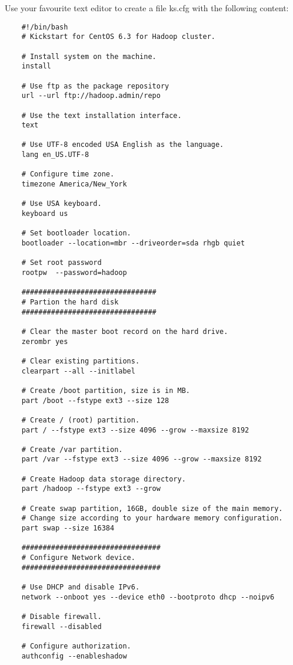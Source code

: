 Use your favourite text editor to create a file ks.cfg with the following content: \\
\begin{verbatim}
    #!/bin/bash
    # Kickstart for CentOS 6.3 for Hadoop cluster.

    # Install system on the machine.
    install

    # Use ftp as the package repository
    url --url ftp://hadoop.admin/repo

    # Use the text installation interface.
    text

    # Use UTF-8 encoded USA English as the language.
    lang en_US.UTF-8

    # Configure time zone.
    timezone America/New_York

    # Use USA keyboard.
    keyboard us

    # Set bootloader location.
    bootloader --location=mbr --driveorder=sda rhgb quiet

    # Set root password
    rootpw  --password=hadoop

    ################################
    # Partion the hard disk
    ################################

    # Clear the master boot record on the hard drive.
    zerombr yes

    # Clear existing partitions.
    clearpart --all --initlabel

    # Create /boot partition, size is in MB.
    part /boot --fstype ext3 --size 128

    # Create / (root) partition.
    part / --fstype ext3 --size 4096 --grow --maxsize 8192

    # Create /var partition.
    part /var --fstype ext3 --size 4096 --grow --maxsize 8192

    # Create Hadoop data storage directory.
    part /hadoop --fstype ext3 --grow

    # Create swap partition, 16GB, double size of the main memory.
    # Change size according to your hardware memory configuration.
    part swap --size 16384

    #################################
    # Configure Network device.
    #################################

    # Use DHCP and disable IPv6.
    network --onboot yes --device eth0 --bootproto dhcp --noipv6

    # Disable firewall.
    firewall --disabled

    # Configure authorization.
    authconfig --enableshadow


\end{verbatim}
